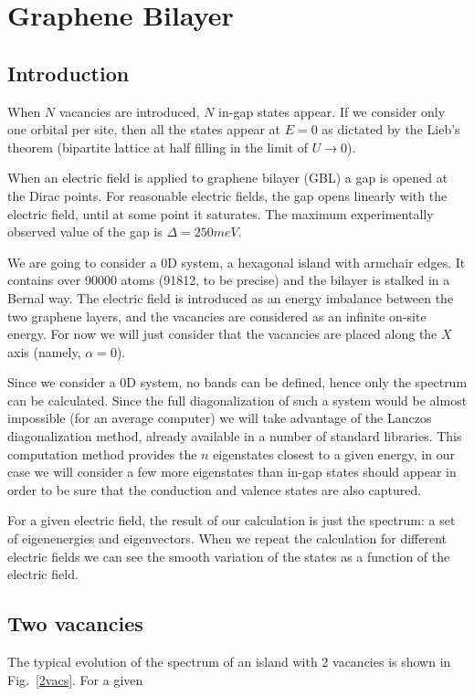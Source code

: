 \chapter{Graphene Bilayer}
\section{Introduction}
When $N$ vacancies are introduced, $N$ in-gap states appear. If we consider only one orbital per site, then all the states appear at $E=0$ as dictated by the Lieb's theorem (bipartite lattice at half filling in the limit of $U\to 0$).

When an electric field is applied to graphene bilayer (GBL) a gap is opened at the Dirac points. For reasonable electric fields, the gap opens linearly with the electric field, until at some point it saturates. The maximum experimentally observed value of the gap is\cite{Zhang2009} $\Delta=250meV$.

We are going to consider a 0D system, a hexagonal island with armchair edges. It contains over 90000 atoms (91812, to be precise) and the bilayer is stalked in a Bernal way.
The electric field is introduced as an energy imbalance between the two graphene layers, and the vacancies are considered as an infinite on-site energy. For now we will just consider that the vacancies are placed along the $X$ axis (namely, $\alpha=0$).

Since we consider a 0D system, no bands can be defined, hence only the spectrum can be calculated. Since the full diagonalization of such a system would be almost impossible (for an average computer) we will take advantage of the Lanczos diagonalization method\cite{Arnoldi1951,Lanczos1950}, already available in a number of standard libraries.
This computation method provides the $n$ eigenstates closest to a given energy, in our case we will consider a few more eigenstates than in-gap states should appear in order to be sure that the conduction and valence states are also captured.

For a given electric field, the result of our calculation is just the spectrum: a set of eigenenergies and eigenvectors. When we repeat the calculation for different electric fields we can see the smooth variation of the states as a function of the electric field.

\section{Two vacancies}
The typical evolution of the spectrum of an island with 2 vacancies is shown in Fig.~\ref{2vacs}. For a given
